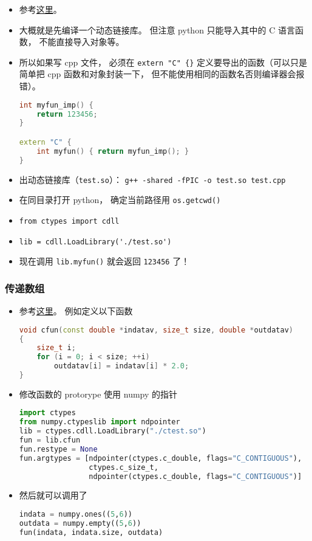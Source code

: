 
\begin{issues}
\issueDraft
\end{issues}

\begin{itemize}
\item 参考\href{https://www.geeksforgeeks.org/how-to-call-c-c-from-python/}{这里}。
\item 大概就是先编译一个动态链接库。 但注意 python 只能导入其中的 C 语言函数， 不能直接导入对象等。
\item 所以如果写 cpp 文件， 必须在 \verb|extern "C" {}| 定义要导出的函数（可以只是简单把 cpp 函数和对象封装一下， 但不能使用相同的函数名否则编译器会报错）。
\begin{lstlisting}[language=cpp, caption=test.cpp]
int myfun_imp() {
	return 123456;
}

extern "C" {
	int myfun() { return myfun_imp(); }
}
\end{lstlisting}
\item {} 出动态链接库（\verb|test.so|）： \verb|g++ -shared -fPIC -o test.so test.cpp|
\item 在同目录打开 python， 确定当前路径用 \verb|os.getcwd()|
\item \verb|from ctypes import cdll|
\item \verb|lib = cdll.LoadLibrary('./test.so')|
\item 现在调用 \verb|lib.myfun()| 就会返回 \verb|123456| 了！
\end{itemize}

\subsubsection{传递数组}
\begin{itemize}
\item 参考\href{https://stackoverflow.com/questions/5862915/passing-numpy-arrays-to-a-c-function-for-input-and-output}{这里}。 例如定义以下函数
\begin{lstlisting}[language=cpp]
void cfun(const double *indatav, size_t size, double *outdatav) 
{
    size_t i;
    for (i = 0; i < size; ++i)
        outdatav[i] = indatav[i] * 2.0;
}
\end{lstlisting}
\item 修改函数的 protorype 使用 numpy 的指针
\begin{lstlisting}[language=python]
import ctypes
from numpy.ctypeslib import ndpointer
lib = ctypes.cdll.LoadLibrary("./ctest.so")
fun = lib.cfun
fun.restype = None
fun.argtypes = [ndpointer(ctypes.c_double, flags="C_CONTIGUOUS"),
                ctypes.c_size_t,
                ndpointer(ctypes.c_double, flags="C_CONTIGUOUS")]
\end{lstlisting}
\item 然后就可以调用了
\begin{lstlisting}[language=python]
indata = numpy.ones((5,6))
outdata = numpy.empty((5,6))
fun(indata, indata.size, outdata)
\end{lstlisting}
\end{itemize}
